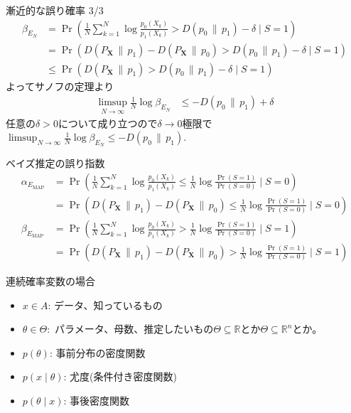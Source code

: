 \documentclass[lualatex,handout]{beamer}
\newcommand\KL[2]{D\left(#1\,\|\,#2\right)}
\theoremstyle{definition}
\begin{document}
\begin{frame}{漸近的な誤り確率 3/3}
\small
\begin{align*}
\beta_{E_N} &= \Pr\left(\frac1N\sum_{k=1}^N\log \frac{p_0(X_k)}{p_1(X_k)} > \KL{p_0}{p_1}-\delta \mid S = 1\right)\\
&= \Pr\left(\KL{P_{\symbf{X}}}{p_1} - \KL{P_{\symbf{X}}}{p_0} > \KL{p_0}{p_1}-\delta \mid S = 1\right)\\
&\le \Pr\left(\KL{P_{\symbf{X}}}{p_1} > \KL{p_0}{p_1}-\delta \mid S = 1\right)
\end{align*}
よってサノフの定理より
\begin{align*}
\limsup_{N\to\infty} \frac1N \log\beta_{E_N} &\le -\KL{p_0}{p_1}+\delta
\end{align*}
任意の$\delta>0$について成り立つので$\delta\to0$極限で
$\limsup_{N\to\infty} \frac1N \log\beta_{E_N} \le -\KL{p_0}{p_1}$.
\end{frame}

\begin{frame}{ベイズ推定の誤り指数}
\begin{align*}
\alpha_{E_{\mathrm{MAP}}} &= \Pr\left(\frac1N\sum_{k=1}^N\log \frac{p_0(X_k)}{p_1(X_k)} \le \frac1N\log\frac{\Pr(S=1)}{\Pr(S=0)}\mid S = 0\right)\\
&= \Pr\left(\KL{P_{\symbf{X}}}{p_1} - \KL{P_{\symbf{X}}}{p_0} \le \frac1N\log\frac{\Pr(S=1)}{\Pr(S=0)}\mid S = 0\right)\\
\beta_{E_{\mathrm{MAP}}} &= \Pr\left(\frac1N\sum_{k=1}^N\log \frac{p_0(X_k)}{p_1(X_k)} > \frac1N\log\frac{\Pr(S=1)}{\Pr(S=0)}\mid S = 1\right)\\
&= \Pr\left(\KL{P_{\symbf{X}}}{p_1} - \KL{P_{\symbf{X}}}{p_0} > \frac1N\log\frac{\Pr(S=1)}{\Pr(S=0)}\mid S = 1\right)
\end{align*}
\end{frame}

\begin{frame}{連続確率変数の場合}
\begin{itemize}
\setlength{\itemsep}{2em}
\item $x\in A$: データ、知っているもの
\item $\theta \in \Theta\colon$ パラメータ、母数、推定したいもの$\Theta\subseteq\mathbb{R}$とか$\Theta\subseteq\mathbb{R}^n$とか。
\item $p(\theta)$: 事前分布の密度関数
\item $p(x \mid \theta)$: 尤度(条件付き密度関数)
\item $p(\theta \mid x)$: 事後密度関数
\end{itemize}
\end{frame}
\end{document}
